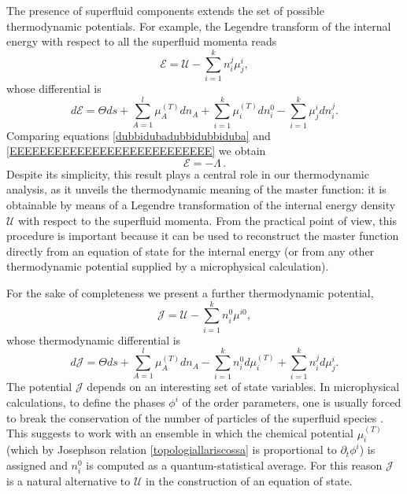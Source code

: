 \documentclass[usenatbib]{mnras}
\begin{document}
The presence of superfluid components extends the set of possible thermodynamic potentials. For example, the Legendre transform of the internal energy with respect to all the superfluid momenta reads
%
\begin{equation}\label{EEEEEEEEEEEEEEEEEEEEEEEEEEE}
\mathcal{E} = \mathcal{U} - \sum_{i=1}^k n_i^j \mu^i_j ,
\end{equation}  
%
whose differential is
%
\begin{equation}
d\mathcal{E} =\Theta ds + \sum_{A=1}^l \mu_A^{(T)} dn_A + \sum_{i=1}^k \mu_i^{(T)} dn_i^0 - \sum_{i=1}^k   \mu^i_j dn_i^j.
\end{equation}
%
Comparing equations \eqref{dubbidubadubbidubbiduba} and \eqref{EEEEEEEEEEEEEEEEEEEEEEEEEEE} we obtain
%
\begin{equation}\label{redunctionism}
\mathcal{E} = -\Lambda \, .
\end{equation}
%
Despite its simplicity, this result plays a central role in our thermodynamic analysis, as it unveils the thermodynamic meaning of the master function: it is obtainable by means of a Legendre transformation of the internal energy density $\mathcal{U}$ with respect to the superfluid momenta. From the practical point of view, this procedure is important because it can be used to reconstruct the master function directly from an equation of state for the internal energy (or from any other thermodynamic potential supplied by a microphysical calculation).

For the sake of completeness we present a further thermodynamic potential, 
%
\begin{equation}
\mathcal{J}= \mathcal{U}-\sum_{i=1}^k n_i^0 \mu^{i0},
\end{equation}
%
whose thermodynamic differential is
%
\begin{equation}
d\mathcal{J} =\Theta ds + \sum_{A=1}^l \mu_A^{(T)} dn_A - \sum_{i=1}^k n_i^0 d \mu_i^{(T)} + \sum_{i=1}^k  n_i^j d\mu^i_j.
\end{equation}
%
The potential $\mathcal{J}$ depends on an interesting set of state variables. In microphysical calculations, to define the phases $\phi^i$ of the order parameters, one is usually forced to break the conservation of the number of particles of the superfluid species \citep{anderson_considerations}. 
This suggests  to work with an ensemble in which the chemical potential $\mu_i^{(T)}$ (which by Josephson relation \eqref{topologiallariscossa} is proportional to $\partial_t \phi^i$) is assigned and $n_i^0$ is computed as a quantum-statistical average. For this reason $\mathcal{J}$ is a natural alternative to $\mathcal{U}$ in the construction of an equation of state.
\end{document}
